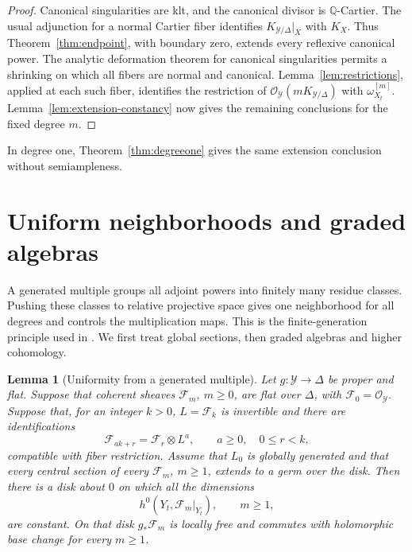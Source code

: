 \documentclass[11pt,a4paper]{article}
\numberwithin{equation}{section}
\newtheorem{lemma}[theorem]{Lemma}
\theoremstyle{definition}
\theoremstyle{remark}
\newcommand{\Q}{\mathbb Q}\newcommand{\R}{\mathbb R}
\newcommand{\OO}{\mathcal O}\newcommand{\cX}{\mathcal X}
\begin{document}
\begin{proof}
Canonical singularities are klt, and the canonical divisor is
$\Q$-Cartier. The usual adjunction for a normal Cartier fiber identifies
$K_{\mathcal Y/\Delta}|_X$ with $K_X$. Thus Theorem~\ref{thm:endpoint},
with boundary zero, extends every reflexive canonical power.
The analytic deformation theorem for canonical singularities
\cite[Lemma~10 and Remark~10.3]{Kollar2021} permits a shrinking on which
all fibers are normal and canonical. Lemma~\ref{lem:restrictions},
applied at each such fiber, identifies the restriction of
$\OO_{\mathcal Y}(mK_{\mathcal Y/\Delta})$ with
$\omega_{X_t}^{[m]}$. Lemma~\ref{lem:extension-constancy} now gives
the remaining conclusions for the fixed degree $m$.
\end{proof}

In degree one, Theorem~\ref{thm:degreeone} gives the same extension
conclusion without semiampleness.


\section{Uniform neighborhoods and graded algebras}
\label{sec:uniform}

A generated multiple groups all adjoint powers into finitely many
residue classes. Pushing these classes to relative projective space
gives one neighborhood for all degrees and controls the multiplication
maps. This is the finite-generation
principle used in \cite[Lemma~11 and paragraph~13]{Kollar2021}.
We first treat global sections, then graded algebras and higher
cohomology.

\begin{lemma}[Uniformity from a generated multiple]
\label{lem:uniform}
Let $g:\mathcal Y\to\Delta$ be proper and flat. Suppose that coherent
sheaves $\mathcal F_m$, $m\ge0$, are flat over $\Delta$, with
$\mathcal F_0=\OO_{\mathcal Y}$. Suppose that, for an integer $k>0$,
$L=\mathcal F_k$ is invertible and there are identifications
\[
 \mathcal F_{ak+r}=\mathcal F_r\otimes L^a,
 \qquad a\ge0,\quad 0\le r<k,
\]
compatible with fiber restriction. Assume that $L_0$ is globally
generated and that every central section of every $\mathcal F_m$,
$m\ge1$, extends to a germ over the disk. Then there is a disk about $0$
on which all the dimensions
\[
 h^0(Y_t,\mathcal F_m|_{Y_t}),\qquad m\ge1,
\]
are constant. On that disk $g_*\mathcal F_m$ is locally free and commutes with
holomorphic base change for every $m\ge1$.
\end{lemma}
\end{document}
